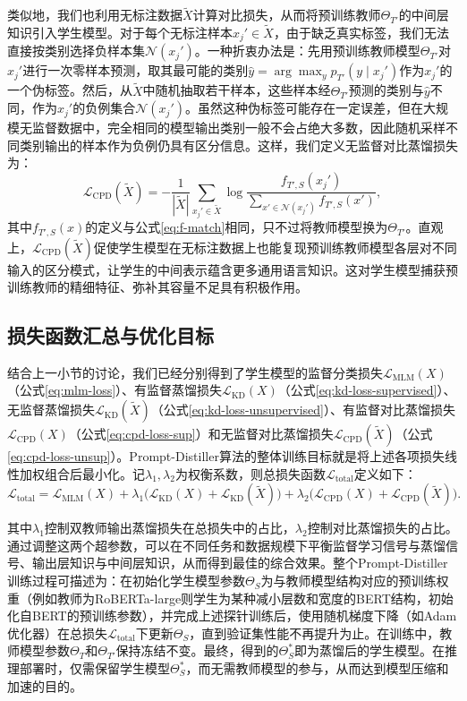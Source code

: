\documentclass[../main.tex]{subfiles}
\begin{document}
类似地，我们也利用无标注数据$\tilde{X}$计算对比损失，从而将预训练教师$\Theta_{T'}$的中间层知识引入学生模型。对于每个无标注样本$x_j'\in \tilde{X}$，由于缺乏真实标签，我们无法直接按类别选择负样本集$\mathcal{N}(x_j')$。一种折衷办法是：先用预训练教师模型$\Theta_{T'}$对$x_j'$进行一次零样本预测，取其最可能的类别$\hat{y} = \arg\max_{y} p_{T'}(y\mid x_j')$作为$x_j'$的一个伪标签。然后，从$\tilde{X}$中随机抽取若干样本，这些样本经$\Theta_{T'}$预测的类别与$\hat{y}$不同，作为$x_j'$的负例集合$\mathcal{N}(x_j')$。虽然这种伪标签可能存在一定误差，但在大规模无监督数据中，完全相同的模型输出类别一般不会占绝大多数，因此随机采样不同类别输出的样本作为负例仍具有区分信息。这样，我们定义无监督对比蒸馏损失为：
\begin{equation}
	\label{eq:cpd-loss-unsup}
	\mathcal{L}_{\text{CPD}}(\tilde{X}) = -\frac{1}{|\tilde{X}|} \sum_{x_j' \in \tilde{X}} \log \frac{f_{T',S}(x_j')}{\displaystyle\sum_{x' \in \mathcal{N}(x_j')} f_{T',S}(x')} ,
\end{equation}
其中$f_{T',S}(x)$的定义与公式\eqref{eq:f-match}相同，只不过将教师模型换为$\Theta_{T'}$。直观上，$\mathcal{L}_{\text{CPD}}(\tilde{X})$促使学生模型在无标注数据上也能复现预训练教师模型各层对不同输入的区分模式，让学生的中间表示蕴含更多通用语言知识。这对学生模型捕获预训练教师的精细特征、弥补其容量不足具有积极作用。

\subsection{损失函数汇总与优化目标}
结合上一小节的讨论，我们已经分别得到了学生模型的监督分类损失$\mathcal{L}_{\text{MLM}}(X)$（公式\eqref{eq:mlm-loss}）、有监督蒸馏损失$\mathcal{L}_{\text{KD}}(X)$（公式\eqref{eq:kd-loss-supervised}）、无监督蒸馏损失$\mathcal{L}_{\text{KD}}(\tilde{X})$（公式\eqref{eq:kd-loss-unsupervised}）、有监督对比蒸馏损失$\mathcal{L}_{\text{CPD}}(X)$（公式\eqref{eq:cpd-loss-sup}）和无监督对比蒸馏损失$\mathcal{L}_{\text{CPD}}(\tilde{X})$（公式\eqref{eq:cpd-loss-unsup}）。Prompt-Distiller算法的整体训练目标就是将上述各项损失线性加权组合后最小化。记$\lambda_1,\lambda_2$为权衡系数，则总损失函数$\mathcal{L}_{\text{total}}$定义如下：
\begin{equation}
	\label{eq:total-loss}
	\mathcal{L}_{\text{total}} = \mathcal{L}_{\text{MLM}}(X) + \lambda_1 \Big( \mathcal{L}_{\text{KD}}(X) + \mathcal{L}_{\text{KD}}(\tilde{X}) \Big) + \lambda_2 \Big( \mathcal{L}_{\text{CPD}}(X) + \mathcal{L}_{\text{CPD}}(\tilde{X}) \Big).
\end{equation}

其中$\lambda_1$控制双教师输出蒸馏损失在总损失中的占比，$\lambda_2$控制对比蒸馏损失的占比。通过调整这两个超参数，可以在不同任务和数据规模下平衡监督学习信号与蒸馏信号、输出层知识与中间层知识，从而得到最佳的综合效果。整个Prompt-Distiller训练过程可描述为：在初始化学生模型参数$\Theta_S$为与教师模型结构对应的预训练权重（例如教师为RoBERTa-large则学生为某种减小层数和宽度的BERT结构，初始化自BERT的预训练参数），并完成上述探针训练后，使用随机梯度下降（如Adam优化器）在总损失$\mathcal{L}_{\text{total}}$下更新$\Theta_S$，直到验证集性能不再提升为止。在训练中，教师模型参数$\Theta_T$和$\Theta_{T'}$保持冻结不变。最终，得到的$\Theta_S^*$即为蒸馏后的学生模型。在推理部署时，仅需保留学生模型$\Theta_S^*$，而无需教师模型的参与，从而达到模型压缩和加速的目的。
\end{document}
